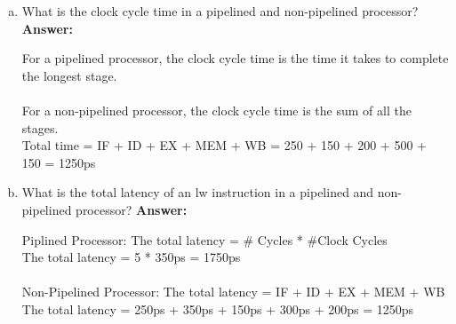 \documentclass[11pt]{article}
\begin{document}
\begin{enumerate}[(a)]
    \item What is the clock cycle time in a pipelined and non-pipelined processor?\\
    \textbf{Answer:}
    \begin{center}
        For a pipelined processor, the clock cycle time is the time it takes to complete the longest stage.\\ 
        \\[0.15in]       
        For a non-pipelined processor, the clock cycle time is the sum of all the stages.\\
        Total time = IF + ID + EX + MEM + WB = 250 + 150 + 200 + 500 + 150 = 1250ps\\
    \end{center}

    \item What is the total latency of an lw instruction in a pipelined and non-pipelined processor?
    \textbf{Answer:}
    \begin{center}
        Piplined Processor:
        The total latency = \# Cycles * \#Clock Cycles\\
        The total latency = 5 * 350ps = 1750ps\\
        \\[0.15in]

        Non-Pipelined Processor:
        The total latency = IF + ID + EX + MEM + WB\\
        The total latency = 250ps + 350ps + 150ps + 300ps + 200ps = 1250ps\\
    \end{center}


\end{enumerate}
\end{document}

